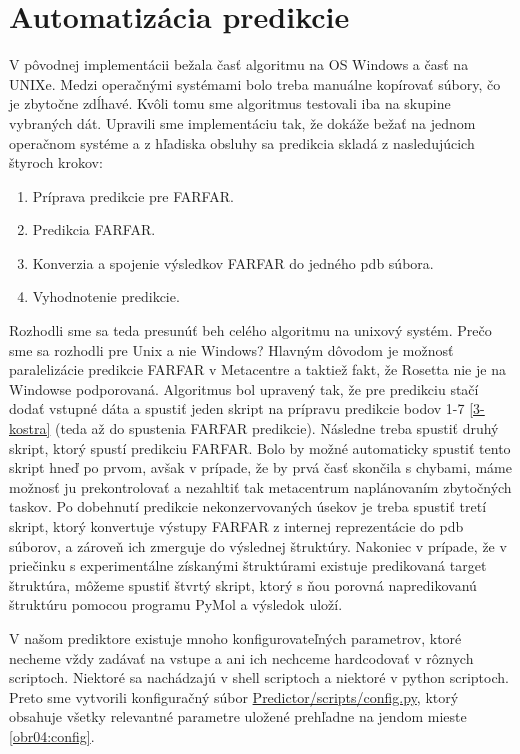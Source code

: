 \section{Automatizácia predikcie}
V pôvodnej implementácii bežala časť algoritmu na OS Windows a časť na UNIXe. Medzi operačnými systémami bolo treba manuálne kopírovať súbory, čo je zbytočne zdĺhavé. Kvôli tomu sme algoritmus testovali iba na skupine vybraných dát. Upravili sme implementáciu tak, že dokáže bežať na jednom operačnom systéme a z hľadiska obsluhy sa predikcia skladá z nasledujúcich štyroch krokov:
\begin{enumerate}
\item Príprava predikcie pre FARFAR.
\item Predikcia FARFAR.
\item Konverzia a spojenie výsledkov FARFAR do jedného pdb súbora.
\item Vyhodnotenie predikcie.
\end{enumerate}

\indent Rozhodli sme sa teda presunúť beh celého algoritmu na unixový systém. Prečo sme sa rozhodli pre Unix a nie Windows? Hlavným dôvodom je možnosť paralelizácie predikcie FARFAR v Metacentre a taktiež fakt, že Rosetta nie je na Windowse podporovaná. Algoritmus bol upravený tak, že pre predikciu stačí dodať vstupné dáta a spustiť jeden skript na prípravu predikcie bodov 1-7 \autoref{3-kostra} (teda až do spustenia FARFAR predikcie). Následne treba spustiť druhý skript, ktorý spustí predikciu FARFAR. Bolo by možné automaticky spustiť tento skript hneď po prvom, avšak v prípade, že by prvá časť skončila s chybami, máme možnosť ju prekontrolovať a nezahltiť tak metacentrum naplánovaním zbytočných taskov. Po dobehnutí predikcie nekonzervovaných úsekov je treba spustiť tretí skript, ktorý konvertuje výstupy FARFAR z internej reprezentácie do pdb súborov, a zároveň ich zmerguje do výslednej štruktúry. Nakoniec v prípade, že v priečinku s experimentálne získanými štruktúrami existuje predikovaná target štruktúra, môžeme spustiť štvrtý skript, ktorý s ňou porovná napredikovanú štruktúru pomocou programu PyMol a výsledok uloží.


\indent V našom prediktore existuje mnoho konfigurovateľných parametrov, ktoré necheme vždy zadávať na vstupe a ani ich nechceme hardcodovať v rôznych scriptoch. Niektoré sa nachádzajú v shell scriptoch a niektoré v python scriptoch. Preto sme vytvorili konfiguračný súbor \url{Predictor/scripts/config.py}, ktorý obsahuje všetky relevantné parametre uložené prehľadne na jendom mieste \autoref{obr04:config}.

